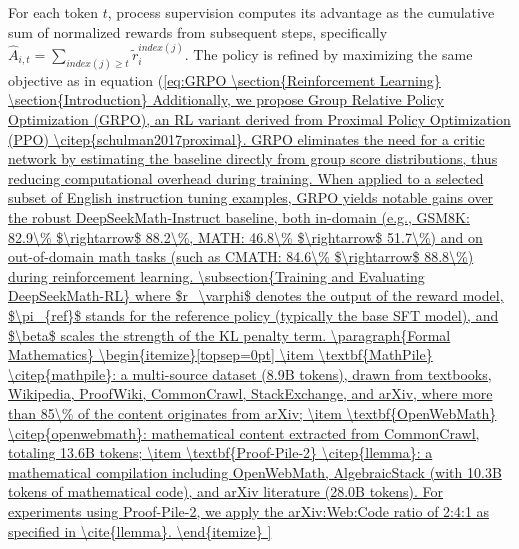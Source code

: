 For each token $t$, process supervision computes its advantage as the cumulative sum of normalized rewards from subsequent steps, specifically $\hat{A}_{i, t} = \sum_{index(j) \ge t} \widetilde{r}_i^{index(j)}$. The policy is refined by maximizing the same objective as in equation (\ref{eq:GRPO

\section{Reinforcement Learning}

\section{Introduction}

Additionally, we propose Group Relative Policy Optimization (GRPO), an RL variant derived from Proximal Policy Optimization (PPO) \citep{schulman2017proximal}. GRPO eliminates the need for a critic network by estimating the baseline directly from group score distributions, thus reducing computational overhead during training. When applied to a selected subset of English instruction tuning examples, GRPO yields notable gains over the robust DeepSeekMath-Instruct baseline, both in-domain (e.g., GSM8K: 82.9\% $\rightarrow$ 88.2\%, MATH: 46.8\% $\rightarrow$ 51.7\%) and on out-of-domain math tasks (such as CMATH: 84.6\% $\rightarrow$ 88.8\%) during reinforcement learning.

\subsection{Training and Evaluating DeepSeekMath-RL}

where $r_\varphi$ denotes the output of the reward model, $\pi_{ref}$ stands for the reference policy (typically the base SFT model), and $\beta$ scales the strength of the KL penalty term.

\paragraph{Formal Mathematics}

\begin{itemize}[topsep=0pt]
    \item \textbf{MathPile} \citep{mathpile}: a multi-source dataset (8.9B tokens), drawn from textbooks, Wikipedia, ProofWiki, CommonCrawl, StackExchange, and arXiv, where more than 85\% of the content originates from arXiv;
    \item \textbf{OpenWebMath} \citep{openwebmath}: mathematical content extracted from CommonCrawl, totaling 13.6B tokens;
    \item \textbf{Proof-Pile-2} \citep{llemma}: a mathematical compilation including OpenWebMath, AlgebraicStack (with 10.3B tokens of mathematical code), and arXiv literature (28.0B tokens). For experiments using Proof-Pile-2, we apply the arXiv:Web:Code ratio of 2:4:1 as specified in \cite{llemma}.
\end{itemize}

}
